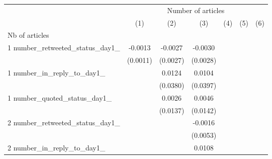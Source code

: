 {
\def\sym#1{\ifmmode^{#1}\else\(^{#1}\)\fi}
\begin{tabular}{l*{6}{c}}
\hline\hline
                    &\multicolumn{6}{c}{Number of articles}                                                                                             \\\cmidrule(lr){2-7}
                    &\multicolumn{1}{c}{(1)}         &\multicolumn{1}{c}{(2)}         &\multicolumn{1}{c}{(3)}         &\multicolumn{1}{c}{(4)}         &\multicolumn{1}{c}{(5)}         &\multicolumn{1}{c}{(6)}         \\
\hline
Nb of articles      &                     &                     &                     &                     &                     &                     \\
1 number\_retweeted\_status\_day1\_&     -0.0013         &     -0.0027         &     -0.0030         &                     &                     &                     \\
                    &    (0.0011)         &    (0.0027)         &    (0.0028)         &                     &                     &                     \\
1 number\_in\_reply\_to\_day1\_&                     &      0.0124         &      0.0104         &                     &                     &                     \\
                    &                     &    (0.0380)         &    (0.0397)         &                     &                     &                     \\
1 number\_quoted\_status\_day1\_&                     &      0.0026         &      0.0046         &                     &                     &                     \\
                    &                     &    (0.0137)         &    (0.0142)         &                     &                     &                     \\
2 number\_retweeted\_status\_day1\_&                     &                     &     -0.0016         &                     &                     &                     \\
                    &                     &                     &    (0.0053)         &                     &                     &                     \\
2 number\_in\_reply\_to\_day1\_&                     &                     &      0.0108         &                     &                     &                     \\

\end{tabular}}
